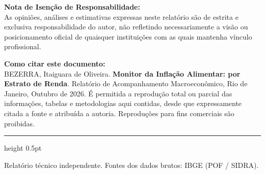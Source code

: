 \documentclass[10pt,a4paper]{article}
\begin{document}
	\vspace{0.10cm}
	
	\begin{tcolorbox}[notabox]
		{\bfseries \color{bisnavy} Nota de Isenção de Responsabilidade:}\\[2pt]
		{\footnotesize \color{secondary} As opiniões, análises e estimativas expressas neste relatório são de estrita e exclusiva responsabilidade do autor, não refletindo necessariamente a visão ou posicionamento oficial de quaisquer instituições com as quais mantenha vínculo profissional.}
	\end{tcolorbox}
	
	\vspace{0.08cm}
	
	\begin{tcolorbox}[notabox]
		{\bfseries \color{bisnavy} Como citar este documento:}\\[2pt]
		{\footnotesize \color{secondary} BEZERRA, Itaiguara de Oliveira. \textbf{Monitor da Inflação Alimentar: por Estrato de Renda}. Relatório de Acompanhamento Macroeconômico, Rio de Janeiro, Outubro de 2026. É permitida a reprodução total ou parcial das informações, tabelas e metodologias aqui contidas, desde que expressamente citada a fonte e atribuída a autoria. Reproduções para fins comerciais são proibidas.}
	\end{tcolorbox}
	
	\vspace{0.10cm}
	{\color{rulecolor}\hrule height 0.5pt}
	\vspace{2pt}
	{\tiny \color{secondary} Relatório técnico independente. Fontes dos dados brutos: IBGE (POF / SIDRA).}
	
\end{document}
